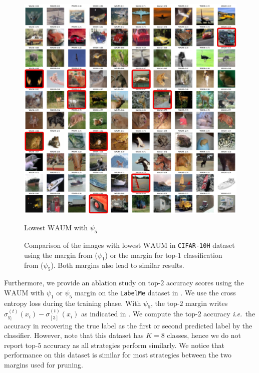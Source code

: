 \begin{figure}[thb]
\begin{minipage}{0.45\textwidth}
        \includegraphics[width=\linewidth]{images/waum_yang.pdf}
        \caption{Lowest $\mathrm{WAUM}$ with $\psi_5$}
        \label{fig:WAUM_yang}
    \end{minipage}
    \caption{Comparison of the images with lowest $\mathrm{WAUM}$ in \texttt{CIFAR-10H} dataset using the margin from \citet{pleiss_identifying_2020} ($\psi_1$) or the margin for top-$1$ classification from \citet{yang2020consistency} ($\psi_5$). Both margins also lead to similar results.}
    \label{fig:waum_app_cifar}
\end{figure}

Furthermore, we provide an ablation study on top-$2$ accuracy scores using the $\mathrm{WAUM}$ with $\psi_1$ or $\psi_5$ margin on the \texttt{LabelMe} dataset in .
We use the cross entropy loss during the training phase.
With $\psi_5$, the top-$2$ margin writes $\sigma_{y_i}^{(t)}(x_i)- \sigma_{[3]}^{(t)}(x_i)$ as indicated in .
We compute the top-$2$ accuracy $\emph{i.e.}$ the accuracy in recovering the true label as the first or second predicted label by the classifier.
However, note that this dataset has $K=8$ classes, hence we do not report top-$5$ accuracy as all strategies perform similarly.
We notice that performance on this dataset is similar for most strategies between the two margins used for pruning.

